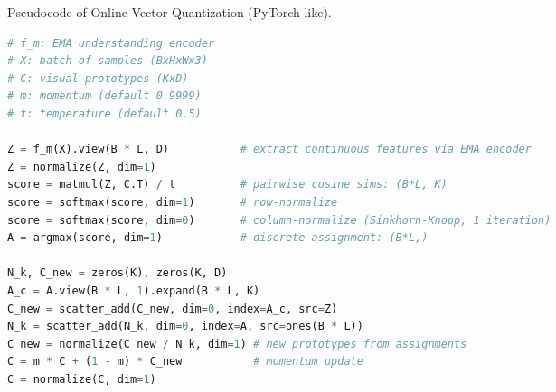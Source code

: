 \documentclass{llmxive}
\begin{document}
\begin{algorithm}[h]
\caption{Pseudocode of Online Vector Quantization (PyTorch-like).}
\label{alg:online_vq}
\begin{lstlisting}[language=Python]
# f_m: EMA understanding encoder
# X: batch of samples (BxHxWx3)
# C: visual prototypes (KxD)
# m: momentum (default 0.9999)
# t: temperature (default 0.5)

Z = f_m(X).view(B * L, D)           # extract continuous features via EMA encoder
Z = normalize(Z, dim=1)
score = matmul(Z, C.T) / t          # pairwise cosine sims: (B*L, K)
score = softmax(score, dim=1)       # row-normalize
score = softmax(score, dim=0)       # column-normalize (Sinkhorn-Knopp, 1 iteration)
A = argmax(score, dim=1)            # discrete assignment: (B*L,)

N_k, C_new = zeros(K), zeros(K, D)
A_c = A.view(B * L, 1).expand(B * L, K)
C_new = scatter_add(C_new, dim=0, index=A_c, src=Z)
N_k = scatter_add(N_k, dim=0, index=A, src=ones(B * L))
C_new = normalize(C_new / N_k, dim=1) # new prototypes from assignments
C = m * C + (1 - m) * C_new           # momentum update
C = normalize(C, dim=1)
\end{lstlisting}
\end{algorithm}






\end{document}
